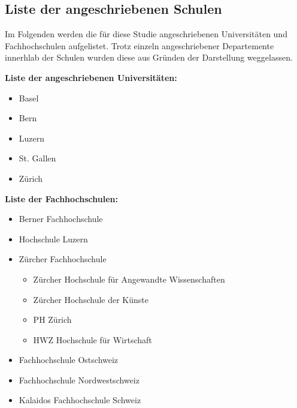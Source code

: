 %
%
\glsresetall
\let\raggedsection\centering 
{}\label{chap.anhang_b}
\let\raggedsection\raggedright 
\begin{RaggedRight}

\section{Liste der angeschriebenen Schulen}\label{appendix.ListeSchulen}
Im Folgenden werden die für diese Studie angeschriebenen Universitäten und Fachhochschulen aufgelistet. Trotz einzeln angeschriebener Departemente innerhlab der Schulen wurden diese aus Gründen der Darstellung weggelassen.\par
\textbf{Liste der angeschriebenen Universitäten:}
\begin{itemize}
    \item Basel
    \item Bern
    \item Luzern
    \item St. Gallen
    \item Zürich
\end{itemize}
\textbf{Liste der Fachhochschulen:}
\begin{itemize}
    \item Berner Fachhochschule
    \item Hochschule Luzern
    \item Zürcher Fachhochschule
    \begin{itemize}
        \item Zürcher Hochschule für Angewandte Wissenschaften
        \item Zürcher Hochschule der Künste
        \item PH Zürich
        \item HWZ Hochschule für Wirtschaft
    \end{itemize}
    \item Fachhochschule Ostschweiz
    \item Fachhochschule Nordwestschweiz 
    \item Kalaidos Fachhochschule Schweiz
\end{itemize}



\end{RaggedRight}

